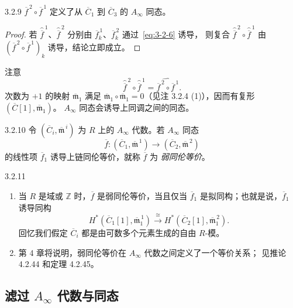 \begin{lemma}{3.2.9}\label{lem:3-2-9}
$\overline f^{\,2}\circ\overline f^{\,1}$ 定义了从
$\overline C_1$ 到 $\overline C_3$ 的 $A_\infty$ 同态。
\end{lemma}

\begin{proof}
若 $\widehat{\overline f}^{\,1}$、$\widehat{\overline f}^{\,2}$ 分别由
$\overline f_k^{\,1}$、$\overline f_k^{\,2}$ 通过~\eqref{eq:3-2-6} 诱导，
则复合 $\widehat{\overline f}^{\,2}\circ
\widehat{\overline f}^{\,1}$ 由
$(\overline f^{\,2}\circ\overline f^{\,1})_k$ 诱导，结论立即成立。
\end{proof}

注意
\[
  \widehat{\overline f}^{\,2}\circ\widehat{\overline f}^{\,1}
  =\widehat{\overline f^{\,2}\circ\overline f^{\,1}}.
\]
次数为 $+1$ 的映射 $\overline{\mathfrak m}_1$ 满足
$\overline{\mathfrak m}_1\circ\overline{\mathfrak m}_1=0$（见注 3.2.4
(1)），因而有复形 $(\overline C[1],\overline{\mathfrak m}_1)$。
$A_\infty$ 同态会诱导上同调之间的同态。

\begin{definition}{3.2.10}\label{def:3-2-10}
令 $(\overline C_i,\overline{\mathfrak m}^{\,i})$ 为 $R$ 上的
$A_\infty$ 代数。若 $A_\infty$ 同态
\[
  \overline f\colon
  (\overline C_1,\overline{\mathfrak m}^{\,1})
  \longrightarrow
  (\overline C_2,\overline{\mathfrak m}^{\,2})
\]
的线性项 $\overline f_1$ 诱导上链同伦等价，就称 $\overline f$ 为
\emph{弱同伦等价}。
\end{definition}

\begin{remark}{3.2.11}\label{rem:3-2-11}
\begin{enumerate}[label=\textup{(\arabic*)},leftmargin=2.8em]
  \item 当 $R$ 是域或 $\mathbb Z$ 时，$\overline f$ 是弱同伦等价，当且仅当
  $\overline f_1$ 是拟同构；也就是说，$\overline f_1$ 诱导同构
  \[
    H^*(\overline C_1[1],\overline{\mathfrak m}^{\,1}_1)
    \xrightarrow{\ \cong\ }
    H^*(\overline C_2[1],\overline{\mathfrak m}^{\,2}_1).
  \]
  回忆我们假定 $\overline C_i$ 都是由可数多个元素生成的自由 $R$-模。

  \item 第 4 章将说明，弱同伦等价在 $A_\infty$ 代数之间定义了一个等价关系；
  见推论 4.2.44 和定理 4.2.45。
\end{enumerate}
\end{remark}

\subsection{滤过 $A_\infty$ 代数与同态}
\label{subsec:3-2-2}

